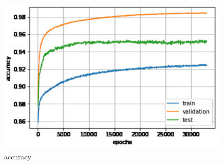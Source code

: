 \documentclass[useamsfonts]{pasj01}
\begin{document}

%
%
\begin{figure}[ht]
  \begin{center}
     \includegraphics[width=\columnwidth]{figures/abs_mag-sflux-accuracy.eps}
  \end{center}
  \caption{%
  accuracy
  }%
  \label{fig:abs_mag-sflux-accuracy}
\end{figure}
%
%
\end{document}
